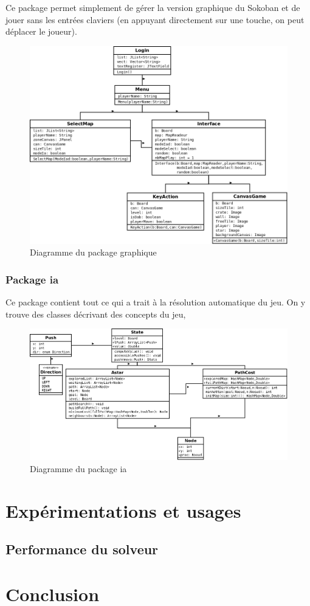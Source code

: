\documentclass[a4paper,12pt]{article} %
\begin{document}
Ce package permet simplement de gérer la version graphique du Sokoban et de jouer sans les entrées claviers (en appuyant directement sur une touche, on peut déplacer le joueur).

\begin{figure}[!h]
\centering
\includegraphics[scale=0.4]{images/graphique.png}
\caption{Diagramme du package graphique}
\end{figure}

\subsubsection{Package ia}

Ce package contient tout ce qui a trait à la résolution automatique du jeu. On y trouve des classes décrivant des concepts du jeu, 

\begin{figure}[!h]
\centering
\includegraphics[scale=0.5]{images/diag_ia.png}
\caption{Diagramme du package ia}
\end{figure}

\section{Expérimentations et usages}

\subsection{Performance du solveur}

\section*{Conclusion}
\end{document}
